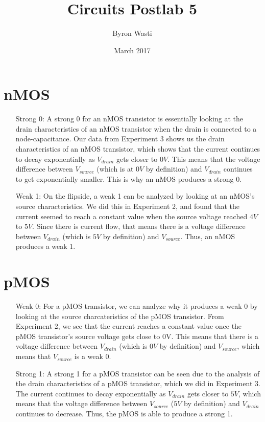 \documentclass{article}
\title{Circuits Postlab 5}
\author{Byron Wasti}
\date{March 2017}
\begin{document}
\maketitle

\section{nMOS}

\begin{itemize}
    \item [Strong 0: ] A strong 0 for an nMOS transistor is essentially looking at the drain characteristics of an nMOS transistor when the drain is connected to a node-capacitance. Our data from Experiment 3 shows us the drain characteristics of an nMOS transistor, which shows that the current continues to decay exponentially as $V_{drain}$ gets closer to $0V$. This means that the voltage difference between $V_{source}$ (which is at $0V$ by definition) and $V_{drain}$ continues to get exponentially smaller. This is why an nMOS produces a strong 0.


    \item [Weak 1: ]  On the flipside, a weak 1 can be analyzed by looking at an nMOS's source characteristics. We did this in Experiment 2, and found that the current seemed to reach a constant value when the source voltage reached $4V$ to $5V$. Since there is current flow, that means there is a voltage difference between $V_{drain}$ (which is $5V$ by definition) and $V_{source}$. Thus, an nMOS produces a weak 1.

\end{itemize}

\section{pMOS}

\begin{itemize}
    \item [Weak 0: ] For a pMOS transistor, we can analyze why it produces a weak 0 by looking at the source charcateristics of the pMOS transistor. From Experiment 2, we see that the current reaches a constant value once the pMOS transistor's source voltage gets close to 0V. This means that there is a voltage difference between $V_{drain}$ (which is $0V$ by definition) and $V_{source}$, which means that $V_{source}$ is a weak 0.

    \item [Strong 1: ] A strong 1 for a pMOS transistor can be seen due to the analysis of the drain characteristics of a pMOS transistor, which we did in Experiment 3. The current continues to decay exponentially as $V_{drain}$ gets closer to $5V$, which means that the voltage difference between $V_{source}$ ($5V$ by definition) and $V_{drain}$ continues to decrease. Thus, the pMOS is able to produce a strong 1.

\end{itemize}
\end{document}
